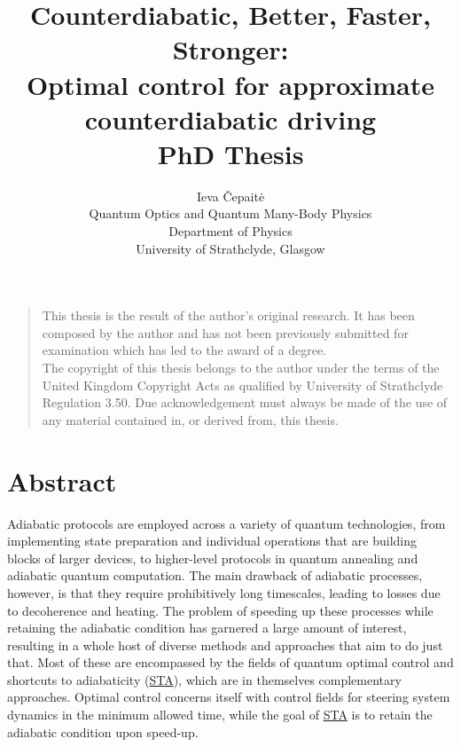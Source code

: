 \documentclass[a4paper,oneside,11pt]{book}
\title{Counterdiabatic, Better, Faster, Stronger: \\
\Large{Optimal control for approximate counterdiabatic driving} \\ PhD Thesis}
\author{Ieva \v{C}epait\.{e}
\\ \small Quantum Optics and Quantum Many-Body Physics\\[-0.8ex]
\small Department of Physics\\[-0.8ex]
\small University of Strathclyde, Glasgow\\
}
\newcommand{\acrref}[1]{\hyperref[acr:#1]{#1}}
\begin{document}
\maketitle

\frontmatter

\vspace*{\fill}
\noindent
\begin{quote}
	\centering
	This thesis is the result of the author's original research. It has been composed by the author and has not been previously submitted for examination which has led to the award of a degree. \\[5pt]
	The copyright of this thesis belongs to the author under the terms of the United Kingdom Copyright Acts as qualified by University of Strathclyde Regulation 3.50. Due acknowledgement must always be made of the use of any material contained in, or derived from, this thesis. \\[5pt]
\end{quote}
\vspace*{\fill}
\chapter{Abstract}\label{chap:abstract}

Adiabatic protocols are employed across a variety of quantum technologies, from implementing state preparation and individual operations that are building blocks of larger devices, to higher-level protocols in quantum annealing and adiabatic quantum computation. The main drawback of adiabatic processes, however, is that they require prohibitively long timescales, leading to losses due to decoherence and heating. The problem of speeding up these processes while retaining the adiabatic condition has garnered a large amount of interest, resulting in a whole host of diverse methods and approaches that aim to do just that. Most of these are encompassed by the fields of quantum optimal control and shortcuts to adiabaticity (\acrref{STA}), which are in themselves complementary approaches. Optimal control concerns itself with control fields for steering system dynamics in the minimum allowed time, while the goal of \acrref{STA} is to retain the adiabatic condition upon speed-up.
\end{document}
